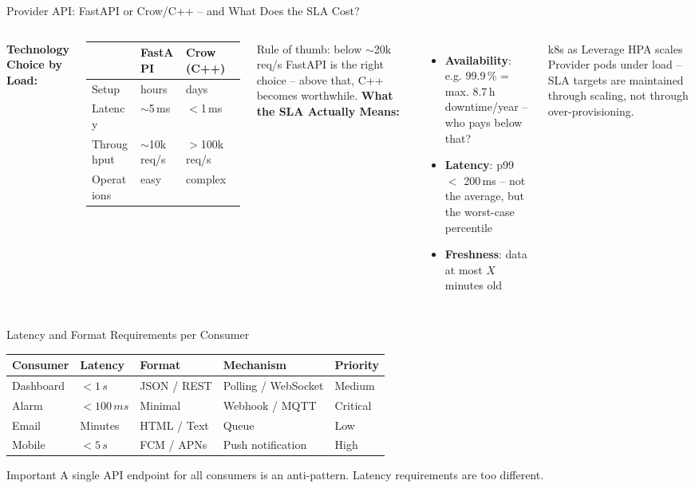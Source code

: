 \documentclass[aspectratio=169]{beamer}
\begin{document}
\begin{frame}{Provider API: FastAPI or Crow/C++ – and What Does the SLA Cost?}
  \begin{columns}
      \textbf{Technology Choice by Load:}
      \begin{tabular}{lll}
        \toprule
        & \textbf{FastAPI} & \textbf{Crow (C++)} \\
        \midrule
        Setup     & hours  & days \\
        Latency   & $\sim$5\,ms & $<$1\,ms \\
        Throughput & $\sim$10k\,req/s & $>$100k\,req/s \\
        Operations & easy  & complex \\
        \bottomrule
      \end{tabular}
      \vspace{0.5em}
      Rule of thumb: below $\sim$20k\,req/s FastAPI is the right choice –
      above that, C++ becomes worthwhile.
      \textbf{What the SLA Actually Means:}
      \begin{itemize}
        \item \textbf{Availability}: e.g. 99.9\,\% = max. 8.7\,h downtime/year – who pays below that?
        \item \textbf{Latency}: p99 $<$ 200\,ms – not the average, but the worst-case percentile
        \item \textbf{Freshness}: data at most $X$ minutes old
      \end{itemize}
      \vspace{0.3em}
      \begin{block}{k8s as Leverage}
        HPA scales Provider pods under load –
        SLA targets are maintained through scaling,
        not through over-provisioning.
      \end{block}
  \end{columns}
\end{frame}

\begin{frame}{Latency and Format Requirements per Consumer}
  \begin{tabular}{lllll}
    \toprule
    \textbf{Consumer} & \textbf{Latency} & \textbf{Format} &
    \textbf{Mechanism} & \textbf{Priority} \\
    \midrule
    Dashboard  & $<1\,s$    & JSON / REST    & Polling / WebSocket & Medium \\
    Alarm      & $<100\,ms$ & Minimal        & Webhook / MQTT      & Critical \\
    Email      & Minutes    & HTML / Text    & Queue               & Low \\
    Mobile     & $<5\,s$    & FCM / APNs     & Push notification   & High \\
    \bottomrule
  \end{tabular}
  \vspace{0.5em}
  \begin{alertblock}{Important}
    A single API endpoint for all consumers is an anti-pattern.
    Latency requirements are too different.
  \end{alertblock}
\end{frame}
\end{document}
